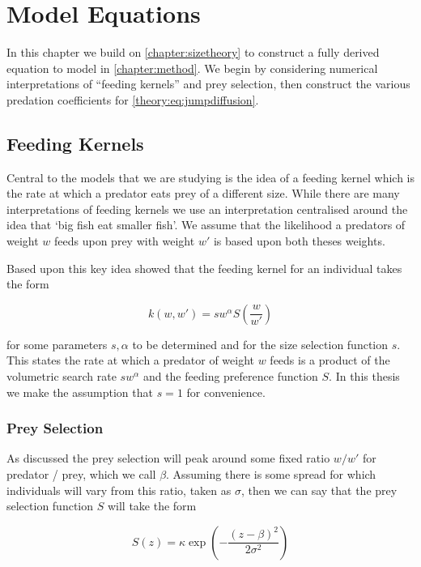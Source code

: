 \documentclass[../main]{subfiles}
\begin{document}
  \chapter{Model Equations}\label{chapter:modelequations}

  In this chapter we build on \autoref{chapter:sizetheory} to construct a fully derived equation to model in \autoref{chapter:method}. We begin by considering numerical interpretations of ``feeding kernels'' and prey selection, then construct the various predation coefficients for \autoref{theory:eq:jumpdiffusion}.

  \section{Feeding Kernels}
  Central to the models that we are studying is the idea of a feeding kernel which is the rate at which a predator eats prey of a different size. While there are many interpretations of feeding kernels we use an interpretation centralised around the idea that `big fish eat smaller fish'. We assume that the likelihood a predators of weight $w$ feeds upon prey with weight $w'$ is based upon both theses weights.

  Based upon this key idea \cite{benoit2004} showed that the feeding kernel for an individual takes the form

  \begin{equation}\label{model:eq:kernel}
    k(w, w') = s w^{\alpha} S\left( \frac{w}{w'} \right)
  \end{equation}

  for some parameters $s, \alpha$ to be determined and for the size selection function $s$. This states the rate at which a predator of weight $w$ feeds is a product of the volumetric search rate $s w^{\alpha}$ and the feeding preference function $S$. In this thesis we make the assumption that $s = 1$ for convenience.

  \subsection{Prey Selection}
  As discussed the prey selection will peak around some fixed ratio $w / w'$ for predator / prey, which we call $\beta$. Assuming there is some spread for which individuals will vary from this ratio, taken as $\sigma$, then we can say that the prey selection function $S$ will take the form

  \begin{equation}
    S(z) = \kappa \exp{\left( - \frac{(z - \beta)^2}{2 \sigma^2} \right)}
  \end{equation}
\end{document}
